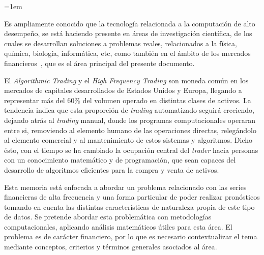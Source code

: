 \parindent=1em

Es ampliamente conocido que la tecnología relacionada a la computación
de alto desempeño, se está haciendo presente en áreas de investigación
científica, de los cuales se desarrollan soluciones a problemas reales,
relacionados a la física, química, biología, informática, etc, como también
en el ámbito de los mercados financieros~\citep{watsham1997quantitative},
que es el área principal del presente documento.

El \emph{Algorithmic Trading} y el \emph{High Frequency Trading} son moneda
común en los mercados de capitales desarrollados de Estados Unidos y Europa,
llegando a representar más del 60\% del volumen operado en distintas clases de
activos. 
La tendencia indica que esta proporción de \emph{trading} automatizado seguirá
creciendo, dejando atrás al \emph{trading} manual, donde los programas
computacionales operaran entre si, removiendo al elemento humano de las
operaciones directas, relegándolo al elemento comercial y al mantenimiento de
estos sistemas y algoritmos. 
Dicho ésto, con el tiempo se ha cambiado la ocupación central del \emph{trader}
hacia personas con un conocimiento matemático y de programación,
que sean capaces del desarrollo de algoritmos eficientes para la compra y venta
de activos.

Esta memoria está enfocada a abordar un problema relacionado con las series
financieras de alta frecuencia y una forma particular de poder realizar
pronósticos tomando en cuenta las distintas características de naturaleza
propia de este tipo de datos. Se pretende abordar esta problemática con
metodologías computacionales, aplicando análisis matemáticos útiles para esta
área. El problema es de carácter financiero, por lo que es necesario
contextualizar el tema mediante conceptos, criterios y términos generales
asociados al área.

